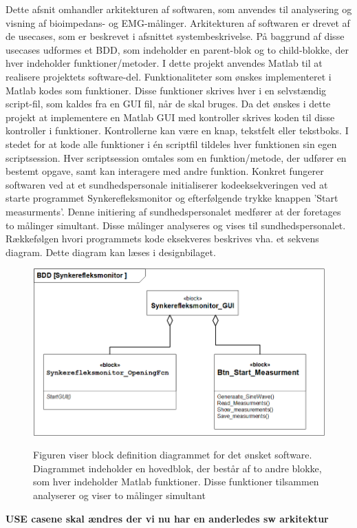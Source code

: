 Dette afsnit omhandler arkitekturen af   softwaren, som anvendes til analysering og visning af bioimpedans- og EMG-målinger. Arkitekturen af softwaren er drevet af de usecases, som er beskrevet i afsnittet systembeskrivelse. På baggrund af disse usecases udformes et BDD, som indeholder en parent-blok og to child-blokke, der hver indeholder funktioner/metoder.
I dette projekt anvendes  Matlab til at realisere projektets  software-del.  Funktionaliteter som ønskes implementeret i Matlab kodes som funktioner. Disse funktioner skrives hver i en selvstændig script-fil, som kaldes fra en GUI fil, når de skal bruges. Da det ønskes i dette projekt at implementere en Matlab GUI med kontroller skrives koden til disse kontroller i funktioner. Kontrollerne kan være en knap, tekstfelt eller tekstboks. I stedet for at kode alle funktioner i én scriptfil tildeles hver funktionen sin egen scriptsession. Hver scriptsession omtales som en funktion/metode, der udfører en bestemt opgave, samt kan interagere med andre funktion. Konkret fungerer softwaren ved at et sundhedspersonale initialiserer kodeeksekveringen ved at starte programmet Synkerefleksmonitor og efterfølgende trykke knappen ’Start measurments'. Denne initiering af sundhedspersonalet medfører at der foretages to målinger simultant. Disse målinger analyseres og vises til sundhedspersonalet. Rækkefølgen hvori programmets kode eksekveres beskrives vha. et sekvens diagram. Dette diagram kan læses i designbilaget.    


\begin{figure}[H] 
\centering
{\includegraphics[width=\linewidth]
{Figure/SWIBD}}
\caption{Figuren viser block definition diagrammet for det ønsket software. Diagrammet indeholder en hovedblok, der består af to andre blokke, som hver indeholder Matlab funktioner. Disse funktioner tilsammen analyserer og viser to målinger simultant  }
\label{figScrip}
\end{figure}

\textbf{USE casene skal ændres der vi nu har en anderledes sw arkitektur}

\citep{Aroom2009}

